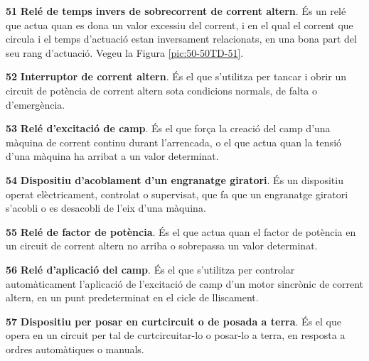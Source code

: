 \begin{multicols}{2}
\begin{list}{}
\item[\textbf{51}]  
\textbf{Relé de temps invers  de sobrecorrent de corrent altern}. És
un relé que actua quan es dona un valor excessiu del corrent, i en el qual el corrent que circula i el temps d'actuació estan inversament relacionats, en una bona part del seu rang d'actuació. Vegeu la Figura \vref{pic:50-50TD-51}.

\item[\textbf{52}]   
\textbf{Interruptor de corrent altern}. És
 el que s'utilitza per tancar i obrir un circuit de potència de corrent altern sota condicions
normals, de falta o d'emergència.

\item[\textbf{53}]  
\textbf{Relé d'excitació de camp}. És el
que força la creació del camp d'una màquina de corrent continu
durant l'arrencada, o el que actua quan la tensió d'una màquina ha
arribat a un valor determinat.

\item[\textbf{54}]  
\textbf{Dispositiu d'acoblament d'un engranatge giratori}. És un dispositiu operat elèctricament, controlat o supervisat, que fa que un engranatge giratori
s'acobli o es desacobli de l'eix d'una màquina.

\item[\textbf{55}]   
\textbf{Relé de factor de potència}. És el que actua quan el factor de potència en un circuit de corrent altern no arriba o
sobrepassa un valor determinat.

\item[\textbf{56}]   
\textbf{Relé d'aplicació del camp}.
És el que s'utilitza per controlar automàticament l'aplicació de l'excitació de camp d'un
motor sincrònic de corrent altern, en un punt predeterminat en el cicle de lliscament.

\item[\textbf{57}]  
\textbf{Dispositiu per posar en  curtcircuit o de posada a terra}. És el que
opera en un circuit per tal de curtcircuitar-lo  o
posar-lo a terra, en resposta a ordres automàtiques o manuals.


\end{list}
\end{multicols}

